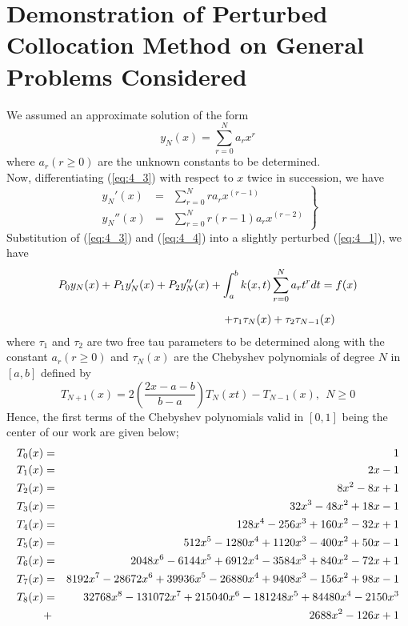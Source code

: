 \documentclass[12pt]{report}
\newcommand{\sps}{\\[0.2cm]}
\newcommand{\refn}[1]{(\ref{#1})}
\newcommand{\refx}[1]{\refn{eq:#1}}
\newcommand{\sprime}{'}
\newcommand{\dprime}{''}
\begin{document}
	\section{Demonstration of Perturbed Collocation Method on General Problems Considered}
	We assumed an approximate solution of the form 
	\begin{equation}
		y_N(x) = \sum_{r=0}^{N}a_rx^r \label{eq:4_3}
	\end{equation}
	where $a_r (r\geq 0)$ are the unknown constants to be determined.\sps
	Now, differentiating \refx{4_3} with respect to $x$ twice in succession, we have
	\begin{equation}
		\left. 
			\begin{array}{rcl}
				y_N\sprime(x) &=& \sum_{r=0}^{N}ra_rx^{(r-1)} \sps
				y_N\dprime(x) &=& \sum_{r=0}^{N}r(r-1)a_rx^{(r-2)}
			\end{array}
		\right\}
		\label{eq:4_4}
	\end{equation}
	Substitution of \refx{4_3} and \refx{4_4} into a slightly perturbed \refx{4_1}, we have 
	\begin{eqnarray}
		P_0y_N(x) + P_1y_N\sprime(x) + P_2y_N\dprime(x) + \int_a^b k(x,t)\sum_{r=0}^{N}a_r t^r dt=f(x)\notag \sps
		+ \tau_1\tau_N(x) + \tau_2\tau_{N-1}(x)~~~~~~ \label{eq:4_5}
	\end{eqnarray}
	where $\tau_1$ and $\tau_2$ are two free tau parameters to be determined along with the constant $a_r (r\geq 0)$ and $\tau_N(x)$ are the Chebyshev polynomials of degree $N$ in $[a,b]$ defined by 
	\begin{equation}
		T_{N+1}(x) = 2\left(\frac{2x-a-b}{b-a}\right)T_N(xt) - T_{N-1}(x), ~~ N\geq 0 \label{eq:4_6}
	\end{equation}	
	Hence, the first terms of the Chebyshev polynomials valid in $[0,1]$ being the center of our work are given below;
	\begin{eqnarray}
		T_0(x) &=& 1 \notag\\
		T_1(x) &=& 2x - 1\notag\\
		T_2(x) &=& 8x^2 - 8x + 1\notag\\
		T_3(x) &=& 32x^3 - 48x^2 + 18x -1\notag\\
		T_4(x) &=& 128x^4 - 256x^3 + 160x^2 - 32x + 1\notag\\
		T_5(x) &=& 512x^5 - 1280x^4 + 1120x^3 - 400x^2 + 50x-1\notag\\
		T_6(x) &=& 2048x^6 - 6144x^5 + 6912x^4 - 3584x^3 + 840x^2 - 72x + 1\notag\\
		T_7(x) &=& 8192x^7 - 28672x^6 + 39936x^5 - 26880x^4 + 9408x^3 - 156x^2 + 98x - 1\notag\\
		T_8(x) &=& 32768x^8 -131072x^7 + 215040x^6 - 181248x^5 + 84480x^4 - 2150x^3 \notag\\
		&+&2688x^2 - 126x + 1\notag
	\end{eqnarray}
\end{document}
